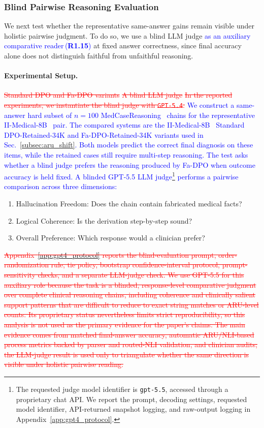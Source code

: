 \documentclass[a4paper,fleqn,doubleblind]{cas-sc}
\DeclareRobustCommand{\deleted}[1]{\textcolor{red}{\sout{#1}}}
\DeclareRobustCommand{\added}[1]{\textcolor{blue}{#1}}
\DeclareRobustCommand{\revtag}[1]{\textcolor{blue}{\scriptsize\,(\textbf{#1})}}
\begin{document}
\subsubsection{Blind Pairwise Reasoning Evaluation}
\label{subsec:gpt4_eval}

We next test whether the representative same-answer gains remain visible under holistic pairwise judgment. To do so, we use a blind LLM judge \added{as an auxiliary comparative reader}\revtag{R1.15} at fixed answer correctness, since final accuracy alone does not distinguish faithful from unfaithful reasoning.

\paragraph{Experimental Setup.}
\deleted{Standard DPO and Fa-DPO variants}
\deleted{A blind LLM judge}
\deleted{In the reported experiments, we instantiate the blind judge with \texttt{GPT-5.4}.}
\added{We construct a same-answer hard subset of $n=100$ MedCaseReasoning~\cite{wu2025medcasereasoning} chains for the representative II-Medical-8B~\cite{intelligentinternet2025iimedical8b} pair. The compared systems are the II-Medical-8B~\cite{intelligentinternet2025iimedical8b} Standard DPO-Retained-34K and Fa-DPO-Retained-34K variants used in Sec.~\ref{subsec:aru_shift}. Both models predict the correct final diagnosis on these items, while the retained cases still require multi-step reasoning. The test asks whether a blind judge prefers the reasoning produced by Fa-DPO when outcome accuracy is held fixed. A blinded GPT-5.5 LLM judge\footnote{The requested judge model identifier is \texttt{gpt-5.5}, accessed through a proprietary chat API. We report the prompt, decoding settings, requested model identifier, API-returned snapshot logging, and raw-output logging in Appendix~\ref{app:gpt4_protocol}.} performs a pairwise comparison across three dimensions:}
\begin{enumerate}
    \item Hallucination Freedom: Does the chain contain fabricated medical facts?
    \item Logical Coherence: Is the derivation step-by-step sound?
    \item Overall Preference: Which response would a clinician prefer?
\end{enumerate}
\deleted{Appendix~\ref{app:gpt4_protocol} reports the blind-evaluation prompt, order-randomization rule, tie policy, bootstrap confidence-interval protocol, prompt-sensitivity checks, and a separate LLM-judge check. We use GPT-5.5 for this auxiliary role because the task is a blinded, response-level comparative judgment over complete clinical reasoning chains, including coherence and clinically salient support patterns that are difficult to reduce to exact string matches or ARU-level counts. Its proprietary status nevertheless limits strict reproducibility, so this analysis is not used as the primary evidence for the paper's claims. The main evidence comes from matched final-answer accuracy, automatic ARU/NLI-based process metrics backed by parser and routed-NLI validation, and clinician audits; the LLM-judge result is used only to triangulate whether the same direction is visible under holistic pairwise reading.}
\end{document}
